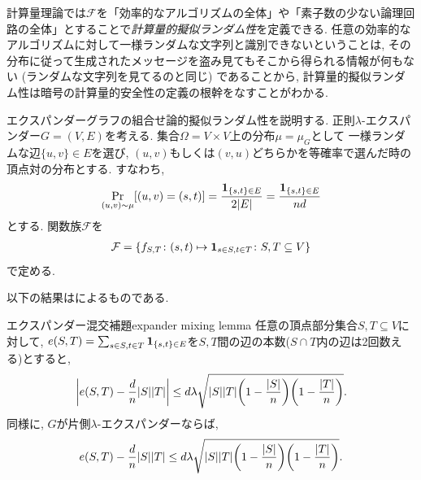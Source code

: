 計算量理論では$\mathcal{F}$を「効率的なアルゴリズムの全体」や「素子数の少ない論理回路の全体」とすることで\emph{計算量的擬似ランダム性}を定義できる.
任意の効率的なアルゴリズムに対して一様ランダムな文字列と識別できないということは, その分布に従って生成されたメッセージを盗み見てもそこから得られる情報が何もない (ランダムな文字列を見てるのと同じ) であることから, 計算量的擬似ランダム性は暗号の計算量的安全性の定義の根幹をなすことがわかる.

エクスパンダーグラフの組合せ論的擬似ランダム性を説明する.
正則$\lambda$-エクスパンダー$G=(V,E)$を考える.
集合$\Omega=V\times V$上の分布$\mu = \mu_G$として
一様ランダムな辺$\{u,v\}\in E$を選び, $(u,v)$もしくは$(v,u)$どちらかを等確率で選んだ時の頂点対の分布とする.
すなわち,
\begin{align}
    \Pr_{(u,v)\sim \mu}\sbra*{ (u,v) = (s,t)} = \frac{\indicator{\{s,t\}\in E}}{2\abs{E}} = \frac{\indicator{\{s,t\}\in E}}{nd} \label{eq:expander mu}
\end{align}
とする.
関数族$\mathcal{F}$を
\begin{align}
    \mathcal{F} = \cbra*{ f_{S,T} \colon (s,t) \mapsto \indicator{s\in S,t\in T} \colon S,T\subseteq V}  \label{eq:expander F}
\end{align}
で定める.

以下の結果は\citet{AC88}によるものである.
%
\begin{lemma}{エクスパンダー混交補題}{expander mixing lemma}
    任意の頂点部分集合$S,T\subseteq V$に対して,
    $e(S,T) = \sum_{s\in S,t\in T} \indicator{\{s,t\} \in E}$を$S,T$間の辺の本数($S\cap T$内の辺は2回数える)とすると,
    \[
        \abs*{e(S,T) - \frac{d}{n}|S||T|} \le d\lambda\sqrt{|S||T|\rbra*{1-\frac{|S|}{n}}\rbra*{1-\frac{|T|}{n}}}.
    \]
    同様に, $G$が片側$\lambda$-エクスパンダーならば,
    \[
        e(S,T) - \frac{d}{n}|S||T| \le d\lambda\sqrt{|S||T|\rbra*{1-\frac{|S|}{n}}\rbra*{1-\frac{|T|}{n}}}.
    \]
\end{lemma}

